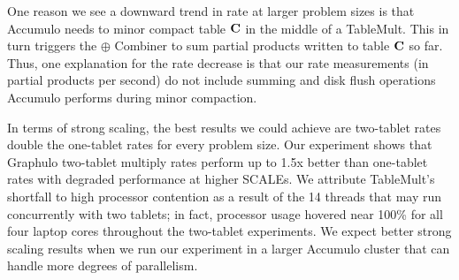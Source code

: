 One reason we see a downward trend in rate at larger problem sizes is that Accumulo
needs to minor compact table $\mathbf{C}$ in the middle of a TableMult. This in turn triggers 
the $\oplus$ Combiner to sum partial products written to table $\mathbf{C}$ so far.
Thus, one explanation for the rate decrease is that 
our rate measurements (in partial products per second) do not include summing 
and disk flush operations Accumulo performs during minor compaction.

In terms of strong scaling, the best results we could achieve are two-tablet rates
double the one-tablet rates for every problem size.
Our experiment shows that Graphulo two-tablet multiply rates perform up to 1.5x better
than one-tablet rates with degraded performance at higher SCALEs.  
We attribute TableMult's shortfall to high processor contention as a result of 
the 14 threads that may run concurrently with two tablets; in fact,
processor usage hovered near 100\% for all four laptop cores throughout the two-tablet experiments.
We expect better strong scaling results when we run our experiment 
in a larger Accumulo cluster that can handle more degrees of parallelism.

